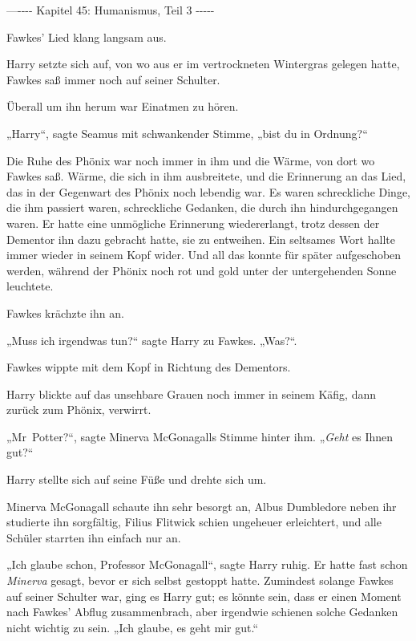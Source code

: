 

\hypertarget{humanismus-teil-3}{%

—\/-\/-\/-\/- Kapitel 45: Humanismus, Teil 3 -\/-\/-\/-\/-

Fawkes' Lied klang langsam aus.

Harry setzte sich auf, von wo aus er im vertrockneten Wintergras gelegen hatte, Fawkes saß immer noch auf seiner Schulter.

Überall um ihn herum war Einatmen zu hören.

„Harry“, sagte Seamus mit schwankender Stimme, „bist du in Ordnung?“

Die Ruhe des Phönix war noch immer in ihm und die Wärme, von dort wo Fawkes saß. Wärme, die sich in ihm ausbreitete, und die Erinnerung an das Lied, das in der Gegenwart des Phönix noch lebendig war. Es waren schreckliche Dinge, die ihm passiert waren, schreckliche Gedanken, die durch ihn hindurchgegangen waren. Er hatte eine unmögliche Erinnerung wiedererlangt, trotz dessen der Dementor ihn dazu gebracht hatte, sie zu entweihen. Ein seltsames Wort hallte immer wieder in seinem Kopf wider. Und all das konnte für später aufgeschoben werden, während der Phönix noch rot und gold unter der untergehenden Sonne leuchtete.

Fawkes krächzte ihn an.

„Muss ich irgendwas tun?“ sagte Harry zu Fawkes. „Was?“.

Fawkes wippte mit dem Kopf in Richtung des Dementors.

Harry blickte auf das unsehbare Grauen noch immer in seinem Käfig, dann zurück zum Phönix, verwirrt.

„Mr~Potter?“, sagte Minerva McGonagalls Stimme hinter ihm. „\emph{Geht} es Ihnen gut?“

Harry stellte sich auf seine Füße und drehte sich um.

Minerva McGonagall schaute ihn sehr besorgt an, Albus Dumbledore neben ihr studierte ihn sorgfältig, Filius Flitwick schien ungeheuer erleichtert, und alle Schüler starrten ihn einfach nur an.

„Ich glaube schon, Professor McGonagall“, sagte Harry ruhig. Er hatte fast schon \emph{Minerva} gesagt, bevor er sich selbst gestoppt hatte. Zumindest solange Fawkes auf seiner Schulter war, ging es Harry gut; es könnte sein, dass er einen Moment nach Fawkes' Abflug zusammenbrach, aber irgendwie schienen solche Gedanken nicht wichtig zu sein. „Ich glaube, es geht mir gut.“

}
